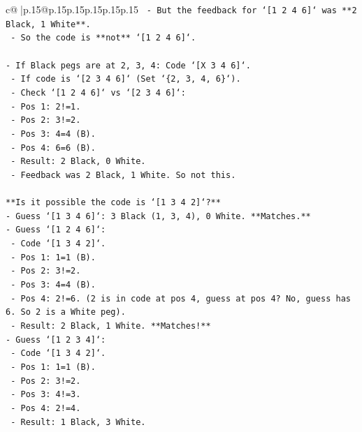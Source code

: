 \documentclass{article}
\begin{document}
{\begin{supertabular}{c@{$\;$}|p{.15\linewidth}@{}p{.15\linewidth}p{.15\linewidth}p{.15\linewidth}p{.15\linewidth}p{.15\linewidth}}
{{{\texttt{            {-}   But the feedback for `{[}1 2 4 6{]}` was **2 Black, 1 White**.} \\
\texttt{            {-}   So the code is **not** `{[}1 2 4 6{]}`.} \\
\\ 
\texttt{{-}   If Black pegs are at 2, 3, 4: Code `{[}X 3 4 6{]}`.} \\
\texttt{    {-}   If code is `{[}2 3 4 6{]}` (Set `\{2, 3, 4, 6\}`).} \\
\texttt{        {-}   Check `{[}1 2 4 6{]}` vs `{[}2 3 4 6{]}`:} \\
\texttt{            {-}   Pos 1: 2!=1.} \\
\texttt{            {-}   Pos 2: 3!=2.} \\
\texttt{            {-}   Pos 3: 4=4 (B).} \\
\texttt{            {-}   Pos 4: 6=6 (B).} \\
\texttt{            {-}   Result: 2 Black, 0 White.} \\
\texttt{            {-}   Feedback was 2 Black, 1 White. So not this.} \\
\\ 
\texttt{**Is it possible the code is `{[}1 3 4 2{]}`?**} \\
\texttt{{-}   Guess `{[}1 3 4 6{]}`: 3 Black (1, 3, 4), 0 White. **Matches.**} \\
\texttt{{-}   Guess `{[}1 2 4 6{]}`:} \\
\texttt{    {-}   Code `{[}1 3 4 2{]}`.} \\
\texttt{    {-}   Pos 1: 1=1 (B).} \\
\texttt{    {-}   Pos 2: 3!=2.} \\
\texttt{    {-}   Pos 3: 4=4 (B).} \\
\texttt{    {-}   Pos 4: 2!=6. (2 is in code at pos 4, guess at pos 4? No, guess has 6. So 2 is a White peg).} \\
\texttt{    {-}   Result: 2 Black, 1 White. **Matches!**} \\
\texttt{{-}   Guess `{[}1 2 3 4{]}`:} \\
\texttt{    {-}   Code `{[}1 3 4 2{]}`.} \\
\texttt{    {-}   Pos 1: 1=1 (B).} \\
\texttt{    {-}   Pos 2: 3!=2.} \\
\texttt{    {-}   Pos 3: 4!=3.} \\
\texttt{    {-}   Pos 4: 2!=4.} \\
\texttt{    {-}   Result: 1 Black, 3 White.} \\
}}}
\end{supertabular}}
\end{document}
